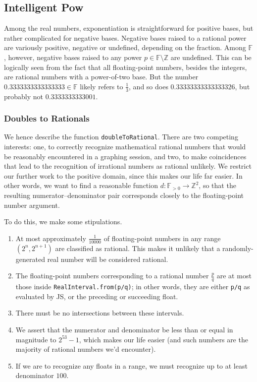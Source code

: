 \documentclass{article}
\newcommand{\finitefp}{\mathbb{F}}
\begin{document}
\subsection{Intelligent Pow}

Among the real numbers, exponentiation is straightforward for positive bases, but rather complicated for negative bases. Negative bases raised to a rational power are variously positive, negative or undefined, depending on the fraction. Among $\finitefp$, however, negative bases raised to any power $p\in\finitefp\setminus\mathbb{Z}$ are undefined. This can be logically seen from the fact that all floating-point numbers, besides the integers, are rational numbers with a power-of-two base. But the number $0.3333333333333333\in\finitefp$ likely refers to $\frac{1}{3}$, and so does $0.33333333333333326$, but probably not $0.3333333333001$.

\subsubsection{Doubles to Rationals}

We hence describe the function \texttt{doubleToRational}. There are two competing interests: one, to correctly recognize mathematical rational numbers that would be reasonably encountered in a graphing session, and two, to make coincidences that lead to the recognition of irrational numbers as rational unlikely. We restrict our further work to the positive domain, since this makes our life far easier. In other words, we want to find a reasonable function $d : \finitefp_{>0} \to \mathbb{Z}^2$, so that the resulting numerator–denominator pair corresponds closely to the floating-point number argument.

To do this, we make some stipulations.

\begin{enumerate}
  \item At most approximately $\frac{1}{10000}$ of floating-point numbers in any range $\left(2^n, 2^{n+1}\right)$ are classified as rational. This makes it unlikely that a randomly-generated real number will be considered rational.
  \item The floating-point numbers corresponding to a rational number $\frac{p}{q}$ are at most those inside \texttt{RealInterval.from(p/q)}; in other words, they are either \texttt{p/q} as evaluated by JS, or the preceding or succeeding float.
  \item There must be no intersections between these intervals.
  \item We assert that the numerator and denominator be less than or equal in magnitude to $2^{53}-1$, which makes our life easier (and such numbers are the majority of rational numbers we'd encounter).
  \item If we are to recognize any floats in a range, we must recognize up to at least denominator $100$.
\end{enumerate}
\end{document}
